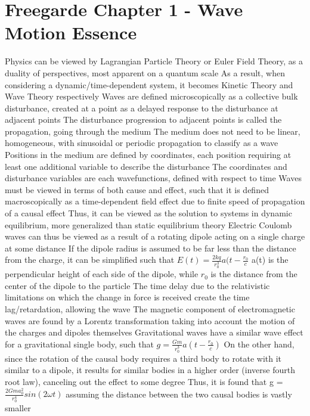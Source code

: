\documentclass[11 pt, twoside]{article}
\newenvironment{outline*}
{
	\begin{outline}[enumerate]
	}
	{\end{outline}
}
\begin{document}
\section{Freegarde Chapter 1 - Wave Motion Essence}
\begin{outline*}
\1 Physics can be viewed by Lagrangian Particle Theory or Euler Field Theory, as a duality of perspectives, most apparent on a quantum scale
\2 As a result, when considering a dynamic/time-dependent system, it becomes Kinetic Theory and Wave Theory respectively
\1 Waves are defined microscopically as a collective bulk disturbance, created at a point as a delayed response to the disturbance at adjacent points
\2 The disturbance progression to adjacent points is called the propagation, going through the medium
\2 The medium does not need to be linear, homogeneous, with sinusoidal or periodic propagation to classify as a wave
\2 Positions in the medium are defined by coordinates, each position requiring at least one additional variable to describe the disturbance
\3 The coordinates and disturbance variables are each wavefunctions, defined with respect to time
\1 Waves must be viewed in terms of both cause and effect, such that it is defined macroscopically as a time-dependent field effect due to finite speed of propagation of a causal effect
\2 Thus, it can be viewed as the solution to systems in dynamic equilibrium, more generalized than static equilibrium theory
\2 Electric Coulomb waves can thus be viewed as a result of a rotating dipole acting on a single charge at some distance
\3 If the dipole radius is assumed to be far less than the distance from the charge, it can be simplified such that $E(t) = \frac{2kq}{r_0^3}a(t - \frac{r_0}{c}$
\4 a(t) is the perpendicular height of each side of the dipole, while $r_0$ is the distance from the center of the dipole to the particle
\4 The time delay due to the relativistic limitations on which the change in force is received create the time lag/retardation, allowing the wave
\4 The magnetic component of electromagnetic waves are found by a Lorentz transformation taking into account the motion of the charges and dipoles themselves
\3 Gravitational waves have a similar wave effect for a gravitational single body, such that $g = \frac{Gm}{r_0^3}a(t - \frac{r_0}{c})$
\4 On the other hand, since the rotation of the causal body requires a third body to rotate with it similar to a dipole, it results for similar bodies in a higher order (inverse fourth root law), canceling out the effect to some degree
\4 Thus, it is found that g = $\frac{2Gma_0^2}{r_0^4}sin(2\omega t)$ assuming the distance between the two causal bodies is vastly smaller

\end{outline*}
\end{document}

